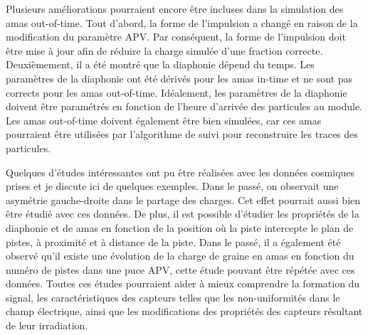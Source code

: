 Plusieurs améliorations pourraient encore être incluses dans la simulation des amas out-of-time. Tout d'abord, la forme de l'impulsion a changé en raison de la modification du paramètre APV. Par conséquent, la forme de l'impulsion doit être mise à jour afin de réduire la charge simulée d'une fraction correcte. Deuxièmement, il a été montré que la diaphonie dépend du temps. Les paramètres de la diaphonie ont été dérivés pour les amas in-time et ne sont pas corrects pour les amas out-of-time. Idéalement, les paramètres de la diaphonie doivent être paramétrés en fonction de l'heure d'arrivée des particules au module. Les amas out-of-time doivent également être bien simulées, car ces amas pourraient être utilisées par l’algorithme de suivi pour reconstruire les traces des particules.



Quelques d’études intéressantes ont pu être réalisées avec les données cosmiques prises et je discute ici de quelques exemples. Dans le passé, on observait une asymétrie gauche-droite dans le partage des charges. Cet effet pourrait aussi bien être étudié avec ces données. De plus, il est possible d'étudier les propriétés de la diaphonie et de amas en fonction de la position où la piste intercepte le plan de pistes, à proximité et à distance de la piste. Dans le passé, il a également été observé qu’il existe une évolution de la charge de graine en amas en fonction du numéro de pistes dans une puce APV, cette étude pouvant être répétée avec ces données. Toutes ces études pourraient aider à mieux comprendre la formation du signal, les caractéristiques des capteurs telles que les non-uniformités dans le champ électrique, ainsi que les modifications des propriétés des capteurs résultant de leur irradiation.

